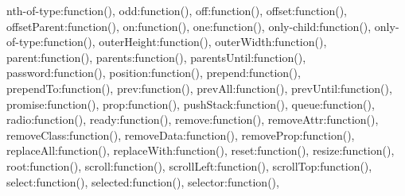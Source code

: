\textquotesingle{}nth-\/of-\/type\textquotesingle{}\+:function()\lcurly{}\rcurly{}, \textquotesingle{}odd\textquotesingle{}\+:function()\lcurly{}\rcurly{}, \textquotesingle{}off\textquotesingle{}\+:function()\lcurly{}\rcurly{}, \textquotesingle{}offset\textquotesingle{}\+:function()\lcurly{}\rcurly{}, \textquotesingle{}offset\+Parent\textquotesingle{}\+:function()\lcurly{}\rcurly{}, \textquotesingle{}on\textquotesingle{}\+:function()\lcurly{}\rcurly{}, \textquotesingle{}one\textquotesingle{}\+:function()\lcurly{}\rcurly{}, \textquotesingle{}only-\/child\textquotesingle{}\+:function()\lcurly{}\rcurly{}, \textquotesingle{}only-\/of-\/type\textquotesingle{}\+:function()\lcurly{}\rcurly{}, \textquotesingle{}outer\+Height\textquotesingle{}\+:function()\lcurly{}\rcurly{}, \textquotesingle{}outer\+Width\textquotesingle{}\+:function()\lcurly{}\rcurly{}, \textquotesingle{}parent\textquotesingle{}\+:function()\lcurly{}\rcurly{}, \textquotesingle{}parents\textquotesingle{}\+:function()\lcurly{}\rcurly{}, \textquotesingle{}parents\+Until\textquotesingle{}\+:function()\lcurly{}\rcurly{}, \textquotesingle{}password\textquotesingle{}\+:function()\lcurly{}\rcurly{}, \textquotesingle{}position\textquotesingle{}\+:function()\lcurly{}\rcurly{}, \textquotesingle{}prepend\textquotesingle{}\+:function()\lcurly{}\rcurly{}, \textquotesingle{}prepend\+To\textquotesingle{}\+:function()\lcurly{}\rcurly{}, \textquotesingle{}prev\textquotesingle{}\+:function()\lcurly{}\rcurly{}, \textquotesingle{}prev\+All\textquotesingle{}\+:function()\lcurly{}\rcurly{}, \textquotesingle{}prev\+Until\textquotesingle{}\+:function()\lcurly{}\rcurly{}, \textquotesingle{}promise\textquotesingle{}\+:function()\lcurly{}\rcurly{}, \textquotesingle{}prop\textquotesingle{}\+:function()\lcurly{}\rcurly{}, \textquotesingle{}push\+Stack\textquotesingle{}\+:function()\lcurly{}\rcurly{}, \textquotesingle{}queue\textquotesingle{}\+:function()\lcurly{}\rcurly{}, \textquotesingle{}radio\textquotesingle{}\+:function()\lcurly{}\rcurly{}, \textquotesingle{}ready\textquotesingle{}\+:function()\lcurly{}\rcurly{}, \textquotesingle{}remove\textquotesingle{}\+:function()\lcurly{}\rcurly{}, \textquotesingle{}remove\+Attr\textquotesingle{}\+:function()\lcurly{}\rcurly{}, \textquotesingle{}remove\+Class\textquotesingle{}\+:function()\lcurly{}\rcurly{}, \textquotesingle{}remove\+Data\textquotesingle{}\+:function()\lcurly{}\rcurly{}, \textquotesingle{}remove\+Prop\textquotesingle{}\+:function()\lcurly{}\rcurly{}, \textquotesingle{}replace\+All\textquotesingle{}\+:function()\lcurly{}\rcurly{}, \textquotesingle{}replace\+With\textquotesingle{}\+:function()\lcurly{}\rcurly{}, \textquotesingle{}reset\textquotesingle{}\+:function()\lcurly{}\rcurly{}, \textquotesingle{}resize\textquotesingle{}\+:function()\lcurly{}\rcurly{}, \textquotesingle{}root\textquotesingle{}\+:function()\lcurly{}\rcurly{}, \textquotesingle{}scroll\textquotesingle{}\+:function()\lcurly{}\rcurly{}, \textquotesingle{}scroll\+Left\textquotesingle{}\+:function()\lcurly{}\rcurly{}, \textquotesingle{}scroll\+Top\textquotesingle{}\+:function()\lcurly{}\rcurly{}, \textquotesingle{}select\textquotesingle{}\+:function()\lcurly{}\rcurly{}, \textquotesingle{}selected\textquotesingle{}\+:function()\lcurly{}\rcurly{}, \textquotesingle{}selector\textquotesingle{}\+:function()\lcurly{}\rcurly{}, 